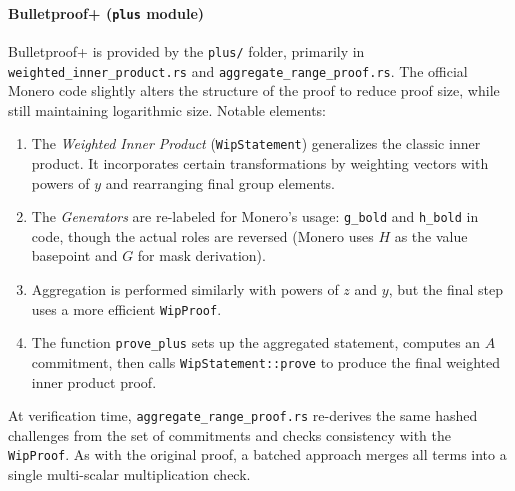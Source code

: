 \documentclass[12pt,a4paper]{article}
\begin{document}
\paragraph{Bulletproof+ (\texttt{plus} module)}
Bulletproof+ is provided by the \texttt{plus/} folder, primarily in \texttt{weighted\_inner\_product.rs} and \texttt{aggregate\_range\_proof.rs}.  The official Monero code slightly alters the structure of the proof to reduce proof size, while still maintaining logarithmic size.  Notable elements:
\begin{enumerate}
    \item The \emph{Weighted Inner Product} (\texttt{WipStatement}) generalizes the classic inner product.  It incorporates certain transformations by weighting vectors with powers of $y$ and rearranging final group elements. %
    \item The \emph{Generators} are re-labeled for Monero's usage: \texttt{g\_bold} and \texttt{h\_bold} in code, though the actual roles are reversed (Monero uses $H$ as the value basepoint and $G$ for mask derivation). %
    \item Aggregation is performed similarly with powers of $z$ and $y$, but the final step uses a more efficient \texttt{WipProof}.
    \item The function \texttt{prove\_plus} sets up the aggregated statement, computes an $A$ commitment, then calls \texttt{WipStatement::prove} to produce the final weighted inner product proof. %
\end{enumerate}

At verification time, \texttt{aggregate\_range\_proof.rs} re-derives the same hashed challenges from the set of commitments and checks consistency with the \texttt{WipProof}.  As with the original proof, a batched approach merges all terms into a single multi-scalar multiplication check.
\end{document}
